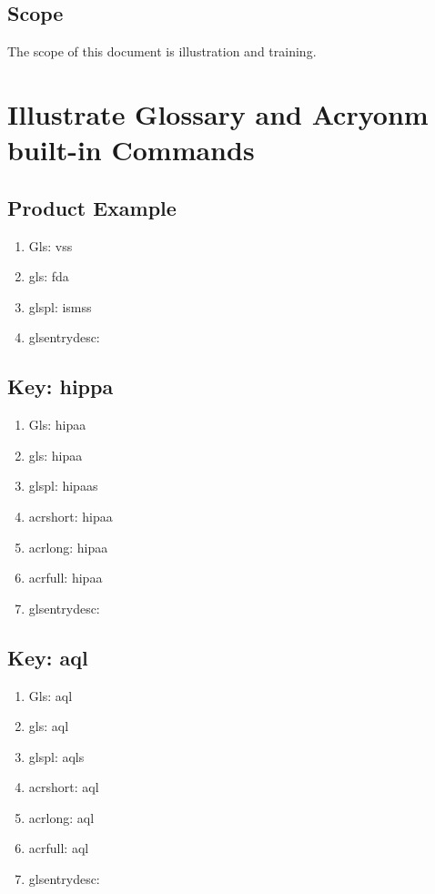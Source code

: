 \subsection{Scope}
The scope of this document is illustration and training.

\section{Illustrate Glossary and Acryonm built-in Commands}

\subsection{Product Example}
\begin{enumerate}
  \item Gls:                   \Gls{vss}
  \item gls:                   \gls{fda}
  \item glspl:               \glspl{isms}
  \item glsentrydesc: 
\end{enumerate}

\subsection{Key: hippa}
\begin{enumerate}
  \item Gls:                   \Gls{hipaa}
  \item gls:                   \gls{hipaa}
  \item glspl:               \glspl{hipaa}
  \item acrshort:         \acrshort{hipaa}
  \item acrlong:           \acrlong{hipaa}
  \item acrfull:           \acrfull{hipaa}
  \item glsentrydesc: 
\end{enumerate}

\subsection{Key: aql}
\begin{enumerate}
  \item Gls:                   \Gls{aql}
  \item gls:                   \gls{aql}
  \item glspl:               \glspl{aql}
  \item acrshort:         \acrshort{aql}
  \item acrlong:           \acrlong{aql}
  \item acrfull:           \acrfull{aql}
  \item glsentrydesc: 
\end{enumerate}

